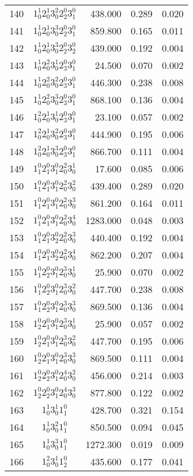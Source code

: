 \documentclass[12pt]{article}
\begin{document}
\begin{table}
\begin{tabular}{rcrrr}
140&$1_0^1 2_0^1 3_0^2 2_2^0 3_1^0$& 438.000& 0.289& 0.020\\
141&$1_0^1 2_0^1 3_0^3 2_2^0 3_1^0$& 859.800& 0.165& 0.011\\
142&$1_0^1 2_0^1 3_0^3 2_2^0 3_2^0$& 439.000& 0.192& 0.004\\
143&$1_0^1 2_0^2 3_0^1 2_3^0 3_1^0$& 24.500& 0.070& 0.002\\
144&$1_0^1 2_0^2 3_0^2 2_3^0 3_1^0$& 446.300& 0.238& 0.008\\
145&$1_0^1 2_0^2 3_0^3 2_3^0 3_1^0$& 868.100& 0.136& 0.004\\
146&$1_0^2 2_0^1 3_0^1 2_3^0 3_1^0$& 23.100& 0.057& 0.002\\
147&$1_0^2 2_0^1 3_0^2 2_3^0 3_1^0$& 444.900& 0.195& 0.006\\
148&$1_0^2 2_0^1 3_0^3 2_3^0 3_1^0$& 866.700& 0.111& 0.004\\
149&$1_1^0 2_1^0 3_1^0 2_0^2 3_0^1$& 17.600& 0.085& 0.006\\
150&$1_1^0 2_1^0 3_1^0 2_0^2 3_0^2$& 439.400& 0.289& 0.020\\
151&$1_1^0 2_1^0 3_1^0 2_0^2 3_0^3$& 861.200& 0.164& 0.011\\
152&$1_1^0 2_1^0 3_1^0 2_0^2 3_0^4$& 1283.000& 0.048& 0.003\\
153&$1_1^0 2_1^0 3_2^0 2_0^2 3_0^3$& 440.400& 0.192& 0.004\\
154&$1_1^0 2_1^0 3_2^0 2_0^2 3_0^4$& 862.200& 0.207& 0.004\\
155&$1_1^0 2_2^0 3_1^0 2_0^3 3_0^1$& 25.900& 0.070& 0.002\\
156&$1_1^0 2_2^0 3_1^0 2_0^3 3_0^2$& 447.700& 0.238& 0.008\\
157&$1_1^0 2_2^0 3_1^0 2_0^3 3_0^3$& 869.500& 0.136& 0.004\\
158&$1_2^0 2_1^0 3_1^0 2_0^3 3_0^1$& 25.900& 0.057& 0.002\\
159&$1_2^0 2_1^0 3_1^0 2_0^3 3_0^2$& 447.700& 0.195& 0.006\\
160&$1_2^0 2_1^0 3_1^0 2_0^3 3_0^3$& 869.500& 0.111& 0.004\\
161&$1_2^0 2_2^0 3_1^0 2_0^4 3_0^2$& 456.000& 0.214& 0.003\\
162&$1_2^0 2_2^0 3_1^0 2_0^4 3_0^3$& 877.800& 0.122& 0.002\\
163&$1_0^1 3_0^1 1_1^0$& 428.700& 0.321& 0.154\\
164&$1_0^1 3_0^2 1_1^0$& 850.500& 0.094& 0.045\\
165&$1_0^1 3_0^3 1_1^0$& 1272.300& 0.019& 0.009\\
166&$1_0^2 3_0^1 1_2^0$& 435.600& 0.177& 0.041\\

\end{tabular}
\end{table}
\end{document}
